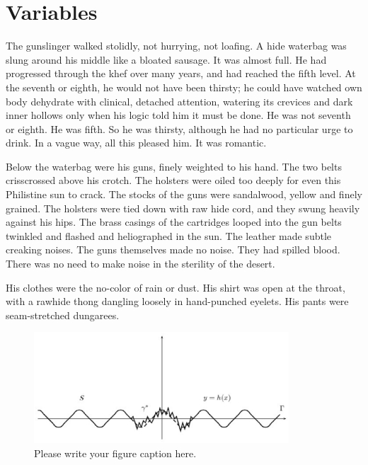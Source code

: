 \documentclass[
11pt,%
tightenlines,%
twoside,%
onecolumn,%
nofloats,%
nobibnotes,%
nofootinbib,%
superscriptaddress,%
noshowpacs,%
centertags]%
{revtex4}
\begin{document}
\section{Variables}

The gunslinger walked stolidly, not hurrying, not loafing. A hide waterbag was slung around his middle like a bloated sausage. It was almost full. He had progressed through the khef over many years, and had reached the fifth level. At the seventh or eighth, he would not have been thirsty; he could have watched own body dehydrate with clinical, detached attention, watering its crevices and dark inner hollows only when his logic told him it must be done. He was not seventh or eighth. He was fifth. So he was thirsty, although he had no particular urge to drink. In a vague way, all this pleased him. It was romantic.

Below the waterbag were his guns, finely weighted to his hand. The two belts crisscrossed above his crotch. The holsters were oiled too deeply for even this Philistine sun to crack. The stocks of the guns were sandalwood, yellow and finely grained. The holsters were tied down with raw hide cord, and they swung heavily against his hips. The brass casings of the cartridges looped into the gun belts twinkled and flashed and heliographed in the sun. The leather made subtle creaking noises. The guns themselves made no noise. They had spilled blood. There was no need to make noise in the sterility of the desert.

His clothes were the no-color of rain or dust. His shirt was open at the throat, with a rawhide thong dangling loosely in hand-punched eyelets. His pants were seam-stretched dungarees.

\begin{figure}[h]
\setcaptionmargin{5mm}
\onelinecaptionstrue  %
\includegraphics[width=0.85\textwidth]{deform.eps}
\caption{Please write your figure caption here.}\label{fig:1}
\end{figure}
\end{document}
